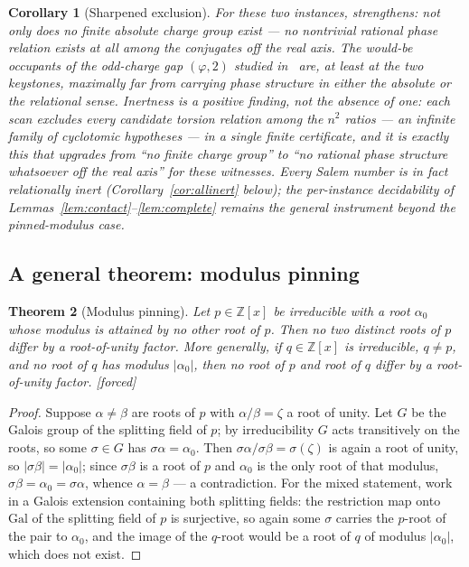 \documentclass[11pt]{article}
\theoremstyle{plain}
\newtheorem{theorem}{Theorem}[section]
\newtheorem{corollary}[theorem]{Corollary}
\theoremstyle{definition}
\theoremstyle{remark}
\newcommand{\Z}{\mathbb{Z}}
\newcommand{\F}{\textnormal{[forced]}}
\begin{document}
\begin{corollary}[Sharpened exclusion]\label{cor:sharpexcl}
For these two instances, \cite[Lem.~6.1]{CMC} strengthens: not only does no
finite absolute charge group exist --- no nontrivial rational phase relation
exists at all among the conjugates off the real axis. The would-be occupants of
the odd-charge gap $(\varphi,2)$ studied in~\cite[Thm.~6.2]{CMC} are, at least
at the two keystones, maximally far from carrying phase structure in either the
absolute or the relational sense. Inertness is a positive finding, not the
absence of one: each scan excludes \emph{every} candidate torsion relation
among the $n^2$ ratios --- an infinite family of cyclotomic hypotheses --- in
a single finite certificate, and it is exactly this that upgrades
\cite[Lem.~6.1]{CMC} from ``no finite charge group'' to ``no rational phase
structure whatsoever off the real axis'' for these witnesses. Every Salem
number is in fact relationally inert (Corollary~\ref{cor:allinert} below);
the per-instance decidability of
Lemmas~\ref{lem:contact}--\ref{lem:complete} remains the general
instrument beyond the pinned-modulus case.
\end{corollary}

\subsection{A general theorem: modulus pinning}

\begin{theorem}[Modulus pinning]\label{thm:pinning}
Let $p\in\Z[x]$ be irreducible with a root $\alpha_0$ whose modulus is
attained by no other root of $p$. Then no two distinct roots of $p$ differ
by a root-of-unity factor. More generally, if $q\in\Z[x]$ is irreducible,
$q\neq p$, and no root of $q$ has modulus $|\alpha_0|$, then no root of $p$
and root of $q$ differ by a root-of-unity factor. \F
\end{theorem}

\begin{proof}
Suppose $\alpha\neq\beta$ are roots of $p$ with $\alpha/\beta=\zeta$ a root
of unity. Let $G$ be the Galois group of the splitting field of $p$; by
irreducibility $G$ acts transitively on the roots, so some $\sigma\in G$
has $\sigma\alpha=\alpha_0$. Then
$\sigma\alpha/\sigma\beta=\sigma(\zeta)$ is again a root of unity, so
$|\sigma\beta|=|\alpha_0|$; since $\sigma\beta$ is a root of $p$ and
$\alpha_0$ is the only root of that modulus, $\sigma\beta=\alpha_0
=\sigma\alpha$, whence $\alpha=\beta$ --- a contradiction. For the mixed
statement, work in a Galois extension containing both splitting fields: the
restriction map onto $\mathrm{Gal}$ of the splitting field of $p$ is
surjective, so again some $\sigma$ carries the $p$-root of the pair to
$\alpha_0$, and the image of the $q$-root would be a root of $q$ of modulus
$|\alpha_0|$, which does not exist.
\end{proof}
\end{document}
